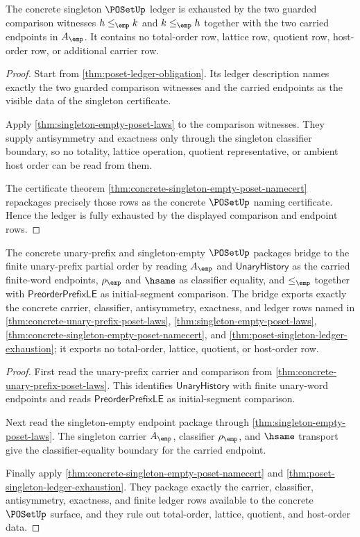 \begin{theorem}
\label{thm:poset-singleton-ledger-exhaustion}
The concrete singleton $\POSetUp$ ledger is exhausted by the two guarded
comparison witnesses $h\le_{\emp}k$ and $k\le_{\emp}h$ together with the two
carried endpoints in $A_{\emp}$. It contains no total-order row, lattice row,
quotient row, host-order row, or additional carrier row.
\end{theorem}
\begin{proof}
Start from \autoref{thm:poset-ledger-obligation}. Its ledger description
names exactly the two guarded comparison witnesses and the carried endpoints
as the visible data of the singleton certificate.

Apply \autoref{thm:singleton-empty-poset-laws} to the comparison witnesses.
They supply antisymmetry and exactness only through the singleton classifier
boundary, so no totality, lattice operation, quotient representative, or
ambient host order can be read from them.

The certificate theorem
\autoref{thm:concrete-singleton-empty-poset-namecert} repackages precisely
those rows as the concrete $\POSetUp$ naming certificate. Hence the ledger is
fully exhausted by the displayed comparison and endpoint rows.
\end{proof}

\begin{theorem}
\label{thm:poset-unary-prefix-standard-bridge-boundary}
The concrete unary-prefix and singleton-empty $\POSetUp$ packages bridge to the
finite unary-prefix partial order by reading $A_{\emp}$ and
$\mathsf{UnaryHistory}$ as the carried finite-word endpoints,
$\rho_{\emp}$ and $\hsame$ as classifier equality, and
$\le_{\emp}$ together with $\mathsf{PreorderPrefixLE}$ as initial-segment
comparison. The bridge exports exactly the concrete carrier, classifier,
antisymmetry, exactness, and ledger rows named in
\autoref{thm:concrete-unary-prefix-poset-laws},
\autoref{thm:singleton-empty-poset-laws},
\autoref{thm:concrete-singleton-empty-poset-namecert}, and
\autoref{thm:poset-singleton-ledger-exhaustion}; it exports no total-order,
lattice, quotient, or host-order row.
\end{theorem}
\begin{proof}
First read the unary-prefix carrier and comparison from
\autoref{thm:concrete-unary-prefix-poset-laws}. This identifies
$\mathsf{UnaryHistory}$ with finite unary-word endpoints and reads
$\mathsf{PreorderPrefixLE}$ as initial-segment comparison.

Next read the singleton-empty endpoint package through
\autoref{thm:singleton-empty-poset-laws}. The singleton carrier $A_{\emp}$,
classifier $\rho_{\emp}$, and $\hsame$ transport give the classifier-equality
boundary for the carried endpoint.

Finally apply \autoref{thm:concrete-singleton-empty-poset-namecert} and
\autoref{thm:poset-singleton-ledger-exhaustion}. They package exactly the
carrier, classifier, antisymmetry, exactness, and finite ledger rows available
to the concrete $\POSetUp$ surface, and they rule out total-order, lattice,
quotient, and host-order data.
\end{proof}

